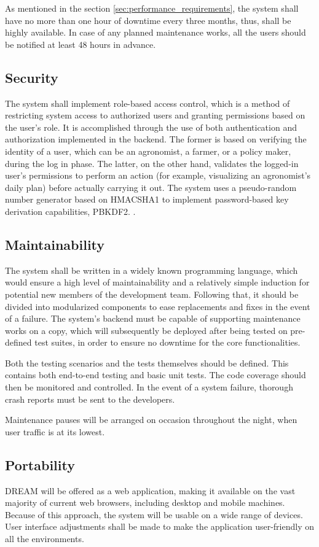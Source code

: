 As mentioned in the section \ref{sec:performance_requirements}, the system shall have no more than one hour of downtime every three months, thus, shall be highly available. In case of any planned maintenance works, all the users should be notified at least 48 hours in advance.

\subsection{Security}

The system shall implement role-based access control, which is a method of restricting system access to authorized users and granting permissions based on the user's role. It is accomplished through the use of both authentication and authorization implemented in the backend. The former is based on verifying the identity of a user, which can be an agronomist, a farmer, or a policy maker, during the log in phase. The latter, on the other hand, validates the logged-in user's permissions to perform an action (for example, visualizing an agronomist's daily plan) before actually carrying it out. The system uses a pseudo-random number generator based on HMACSHA1 to implement password-based key derivation capabilities, PBKDF2. \cite{Rfc2898DeriveBytes}.

\subsection{Maintainability}

The system shall be written in a widely known programming language, which would ensure a high level of maintainability and a relatively simple induction for potential new members of the development team. Following that, it should be divided into modularized components to ease replacements and fixes in the event of a failure. The system's backend must be capable of supporting maintenance works on a copy, which will subsequently be deployed after being tested on pre-defined test suites, in order to ensure no downtime for the core functionalities.

Both the testing scenarios and the tests themselves should be defined. This contains both end-to-end testing and basic unit tests. The code coverage should then be monitored and controlled. In the event of a system failure, thorough crash reports must be sent to the developers.

Maintenance pauses will be arranged on occasion throughout the night, when user traffic is at its lowest.

\subsection{Portability}

DREAM will be offered as a web application, making it available on the vast majority of current web browsers, including desktop and mobile machines. Because of this approach, the system will be usable on a wide range of devices. User interface adjustments shall be made to make the application user-friendly on all the environments.
